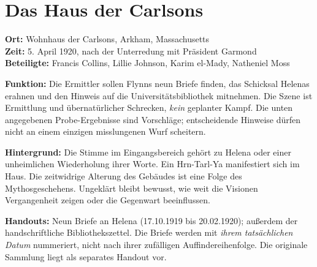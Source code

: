 
\chapter{Das Haus der Carlsons}
\noindent\textbf{Ort:} Wohnhaus der Carlsons, Arkham, Massachusetts\\
\textbf{Zeit:} 5. April 1920, nach der Unterredung mit Präsident Garmond\\
\textbf{Beteiligte:} Francis Collins, Lillie Johnson, Karim el-Mady, Natheniel Moss

\begin{meisterinfo}
\textbf{Funktion:} Die Ermittler sollen Flynns neun Briefe finden, das Schicksal Helenas erahnen und den Hinweis auf die Universitätsbibliothek mitnehmen. Die Szene ist Ermittlung und übernatürlicher Schrecken, \emph{kein} geplanter Kampf. Die unten angegebenen Probe-Ergebnisse sind Vorschläge; entscheidende Hinweise dürfen nicht an einem einzigen misslungenen Wurf scheitern.

\textbf{Hintergrund:} Die Stimme im Eingangsbereich gehört zu Helena oder einer unheimlichen Wiederholung ihrer Worte. Ein Hrn-Tarl-Ya manifestiert sich im Haus. Die zeitwidrige Alterung des Gebäudes ist eine Folge des Mythosgeschehens. Ungeklärt bleibt bewusst, wie weit die Visionen Vergangenheit zeigen oder die Gegenwart beeinflussen.

\textbf{Handouts:} Neun Briefe an Helena (17.10.1919 bis 20.02.1920); au\ss{}erdem der handschriftliche Bibliothekszettel. Die Briefe werden mit \emph{ihrem tatsächlichen Datum} nummeriert, nicht nach ihrer zufälligen Auffindereihenfolge. Die originale Sammlung liegt als separates Handout vor.
\end{meisterinfo}

